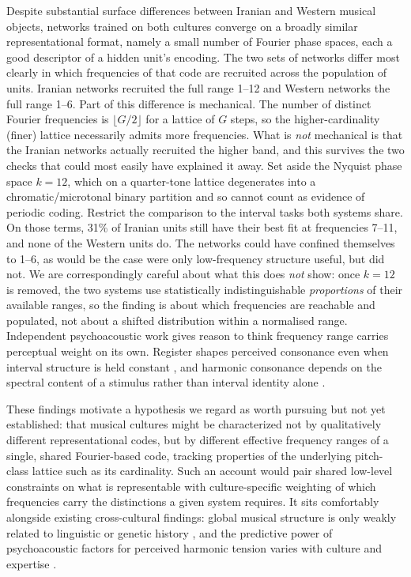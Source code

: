\documentclass[pdflatex,sn-nature]{sn-jnl}
\newcommand{\num}[1]{#1}
\begin{document}
Despite substantial surface differences between Iranian and Western musical objects,
networks trained on both cultures converge on a broadly similar representational format,
namely a small number of Fourier phase spaces, each a good descriptor of a hidden unit's
encoding.
The two sets of networks differ most clearly in which frequencies of that code are
recruited across the population of units. Iranian networks recruited the full range 1--12
and Western networks the full range 1--6. Part of this difference is mechanical. The number
of distinct Fourier frequencies is $\lfloor G/2\rfloor$ for a lattice of $G$ steps, so the
higher-cardinality (finer) lattice necessarily admits more frequencies. What is \emph{not}
mechanical is that the Iranian networks actually recruited the higher band, and this
survives the two checks that could most easily have explained it away. Set aside the Nyquist phase space $k=12$, which on a
quarter-tone lattice degenerates into a chromatic/microtonal binary partition and so
cannot count as evidence of periodic coding. Restrict the comparison to the interval tasks
both systems share. On those terms, \num{31}\% of Iranian units still have their best fit
at frequencies 7--11, and none of the Western units do. The networks could have confined themselves to 1--6, as would be the
case were only low-frequency structure useful, but did not. We are correspondingly careful
about what this does \emph{not} show: once $k=12$ is removed, the two systems use
statistically indistinguishable \emph{proportions} of their available ranges, so the
finding is about which frequencies are reachable and populated, not about a shifted
distribution within a normalised range. Independent psychoacoustic work
gives reason to think frequency range carries perceptual weight on its own. Register shapes
perceived consonance even when interval structure is held constant \cite{eerola2022}, and
harmonic consonance depends on the spectral content of a stimulus rather than interval
identity alone \cite{marjieh2024}.

These findings motivate a hypothesis we regard as worth pursuing but not yet established:
that musical cultures might be characterized not by qualitatively different representational
codes, but by different effective frequency ranges of a single, shared Fourier-based code,
tracking properties of the underlying pitch-class lattice such as its cardinality. Such an account would pair shared low-level constraints
on what is representable with culture-specific weighting of which frequencies carry the
distinctions a given system requires. It sits comfortably alongside existing cross-cultural
findings: global musical structure is only weakly related to linguistic or genetic history
\cite{passmore2024}, and the predictive power of psychoacoustic factors for perceived
harmonic tension varies with culture and expertise \cite{armitage2023}.
\end{document}
